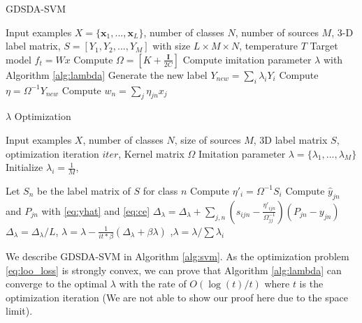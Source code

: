 \begin{algorithm}[t]
	\caption{GDSDA-SVM}\label{alg:svm}
	\begin{algorithmic}
		\REQUIRE Input examples $X=\{\textbf{x}_1,...,\textbf{x}_L\}$, number of classes $N$, number of sources $M$, 3-D label matrix, $S=[Y_1,Y_2,...,Y_{M}]$ with size $L\times M \times N$, temperature $T$ %
		\ENSURE Target model $f_t = Wx$
		\STATE Compute $\Omega=[K+\frac{\mathbf{I}}{2C}]$
		\STATE Compute imitation parameter $\lambda$ with Algorithm \ref{alg:lambda}
		\STATE Generate the new label $Y_{new}=\sum_i\lambda_iY_i$
		\STATE Compute $\eta = \Omega^{-1}Y_{new}$
		\STATE Compute $w_n = \sum_j \eta_{jn}x_j$
	\end{algorithmic}	
\end{algorithm}
\begin{algorithm}[t]
	\caption{$\lambda$ Optimization}\label{alg:lambda}
\begin{algorithmic}
	\REQUIRE Input examples $X$, number of classes $N$, size of sources $M$, 3D label matrix $S$,  optimization iteration $iter$, Kernel matrix $\Omega$
    \ENSURE Imitation parameter $\lambda=\{\lambda_1,...,\lambda_M\}$
    \STATE Initialize $\lambda_i = \frac{1}{M}$, 
    
    \STATE Let $S_n$ be the label matrix of $S$ for class $n$
    \STATE Compute $\eta'_i=\Omega^{-1}S_i$ 
	    \STATE Compute $\hat{y}_{jn}$ and $P_{jn}$ with \eqref{eq:yhat}  and \eqref{eq:ce}
	    \FOR {each $\textbf{x}_j$ in $X$}
		    \STATE $\Delta_{\lambda} = \Delta_{\lambda}+\sum_{j,n}\left(s_{ijn}-\frac{{\eta'}_{ijn}}{\Omega_{jj}^{-1}}\right)\left(P_{jn}-{y}_{jn}\right)$
	    \ENDFOR
	    \STATE $\Delta_{\lambda} =\Delta_{\lambda}/L$, $\lambda = \lambda - \frac{1}{it*\beta }(\Delta_{\lambda}+\beta\lambda)$
	    ,$\lambda = \lambda / \sum\lambda_i$
    \ENDFOR
\end{algorithmic}	
\end{algorithm}

We describe GDSDA-SVM in Algorithm \ref{alg:svm}. As the optimization problem \eqref{eq:loo_loss} is strongly convex, we can prove that Algorithm \ref{alg:lambda} can converge to the optimal $\lambda$ with the rate of $O(\log(t)/t)$ where $t$ is the optimization iteration (We are not able to show our proof here due to the space limit). 




